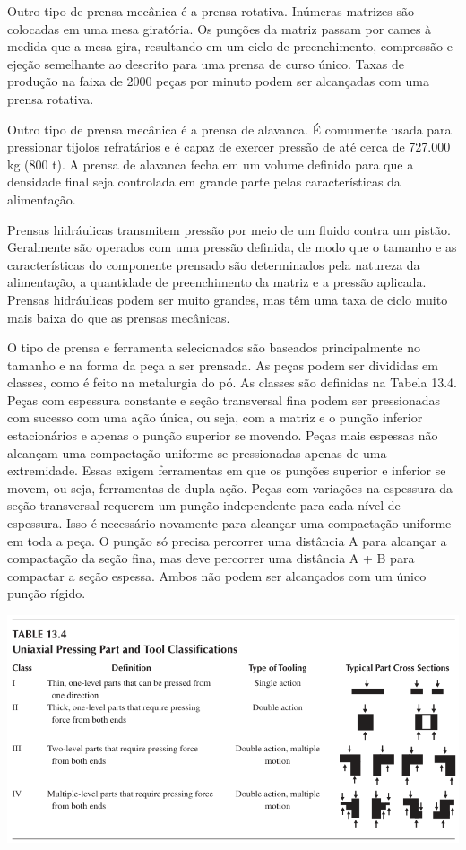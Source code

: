 Outro tipo de prensa mecânica é a prensa rotativa. Inúmeras matrizes são colocadas em uma mesa giratória. Os punções da matriz passam por cames à medida que a mesa gira, resultando em um ciclo de preenchimento, compressão e ejeção semelhante ao descrito para uma prensa de curso único. Taxas de produção na faixa de 2000 peças por minuto podem ser alcançadas com uma prensa rotativa.

Outro tipo de prensa mecânica é a prensa de alavanca. É comumente usada para pressionar tijolos refratários e é capaz de exercer pressão de até cerca de 727.000 kg (800 t). A prensa de alavanca fecha em um volume definido para que a densidade final seja controlada em grande parte pelas características da alimentação.

Prensas hidráulicas transmitem pressão por meio de um fluido contra um pistão. Geralmente são operados com uma pressão definida, de modo que o tamanho e as características do componente prensado são determinados pela natureza da alimentação, a quantidade de preenchimento da matriz e a pressão aplicada. Prensas hidráulicas podem ser muito grandes, mas têm uma taxa de ciclo muito mais baixa do que as prensas mecânicas.

O tipo de prensa e ferramenta selecionados são baseados principalmente no tamanho e na forma da peça a ser prensada. As peças podem ser divididas em classes, como é feito na metalurgia do pó. As classes são definidas na Tabela 13.4. Peças com espessura constante e seção transversal fina podem ser pressionadas com sucesso com uma ação única, ou seja, com a matriz e o punção inferior estacionários e apenas o punção superior se movendo. Peças mais espessas não alcançam uma compactação uniforme se pressionadas apenas de uma extremidade. Essas exigem ferramentas em que os punções superior e inferior se movem, ou seja, ferramentas de dupla ação. Peças com variações na espessura da seção transversal requerem um punção independente para cada nível de espessura. Isso é necessário novamente para alcançar uma compactação uniforme em toda a peça. O punção só precisa percorrer uma distância A para alcançar a compactação da seção fina, mas deve percorrer uma distância A + B para compactar a seção espessa. Ambos não podem ser alcançados com um único punção rígido.

\includegraphics*[width=\linewidth]{./images/tabela_prensa_uniaxial.png}

